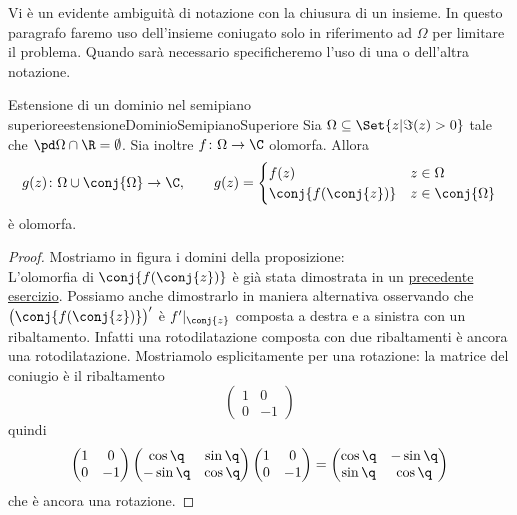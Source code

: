 \begin{notz}
	Vi è un evidente ambiguità di notazione con la chiusura di un insieme. In questo paragrafo faremo uso dell'insieme coniugato solo in riferimento ad \(\Omega\) per limitare il problema. Quando sarà necessario specificheremo l'uso di una o dell'altra notazione.
\end{notz}

\begin{prop}{Estensione di un dominio nel semipiano superiore}{estensioneDominioSemipianoSuperiore}
	Sia \(\Omega\subseteq\Set{z | \Im(z)>0}\) tale che \(\pd\Omega \cap \R = \emptyset\). Sia inoltre \(f\colon \Omega \to \C\) olomorfa. Allora
	\[
		g(z) \colon \Omega \cup \conj{\Omega} \to \C, \qquad g(z) = \begin{cases}
			f(z)               & z\in\Omega        \\
			\conj{f(\conj{z})} & z\in\conj{\Omega}
		\end{cases}
	\]
	è olomorfa.
\end{prop}

\begin{proof}
	Mostriamo in figura i domini della proposizione:
	\[
		
	\]
	L'olomorfia di \(\conj{f(\conj{z})}\) è già stata dimostrata in un \hyperref[exe:olomorfiaEstensioneSchwarz]{precedente esercizio}. Possiamo anche dimostrarlo in maniera alternativa osservando che \(\big(\conj{f(\conj{z})}\big)'\) è \(f'|_{\conj{z}}\) composta a destra e a sinistra con un ribaltamento. Infatti una rotodilatazione composta con due ribaltamenti è ancora una rotodilatazione. Mostriamolo esplicitamente per una rotazione: la matrice del coniugio è il ribaltamento
	\[
		\begin{pmatrix}
			1 & 0   \\
			0 & -1
		\end{pmatrix}
	\]
	quindi
	\[
		\begin{pmatrix}1 & 0\\0 & -1\end{pmatrix}\begin{pmatrix}\cos \q & \sin \q\\-\sin \q & \cos \q\end{pmatrix}\begin{pmatrix}1 & 0\\0 & -1\end{pmatrix} = \begin{pmatrix}\cos\q & -\sin\q\\\sin \q & \cos \q\end{pmatrix}
	\]
	che è ancora una rotazione.
\end{proof}

